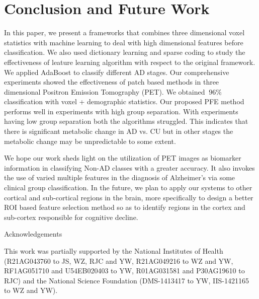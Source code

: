 \documentclass[authoryear,preprint,revi	ew,12pt]{elsarticle}
\newcommand{\Alz} {{Alzheimer\textquoteright s} }
\begin{document}
\section{Conclusion and Future Work}
In this paper, we present a frameworks that combines three dimensional voxel statistics with machine learning to deal with high dimensional features before classification. We also used dictionary learning and sparse coding to study the effectiveness of leature learning algorithm with respect to the original framework. We applied AdaBoost to classify different AD stages. Our comprehensive experiments showed the effectiveness of patch based methods in three dimensional Positron Emission Tomography (PET). We obtained $ ~96 \% $ classification with voxel + demographic statistics.
Our proposed PFE method performs well in experiments with high group separation. With experiments having low group separation both the algorithms struggled. This indicates that there is significant metabolic change in AD vs. CU but in other stages the metabolic change may be unpredictable to some extent. 

We hope our work sheds light on the utilization of PET images as biomarker information in classifying Non-AD classes with a greater accuracy. It also invokes the use of varied multiple features in the diagnosis of \Alz via some clinical group classification. In the future, we plan to apply our systems to other cortical and sub-cortical regions in the brain, more specifically to design a better ROI based feature selection method so as to identify regions in the cortex and sub-cortex responsible for cognitive decline.

\begin{center}
{\large Acknowledgements}
\end{center}

This work was partially supported by the National Institutes of Health (R21AG043760 to JS, WZ, RJC and YW, R21AG049216 to WZ and YW, RF1AG051710 and U54EB020403 to YW, R01AG031581 and P30AG19610 to RJC) and the National Science Foundation (DMS-1413417 to YW, IIS-1421165 to WZ and YW).
\end{document}
